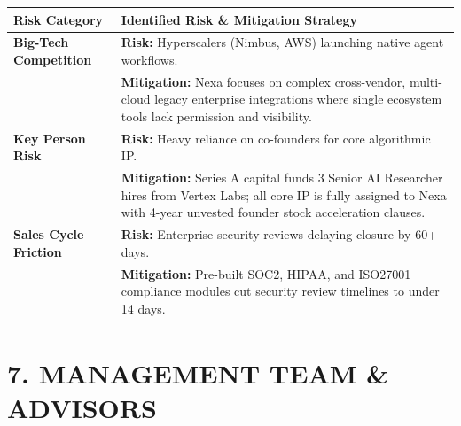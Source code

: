 \documentclass[10pt,a4paper]{article}
\begin{document}
\small
{}
\begin{tabularx}{\textwidth}{@{} L{2.6cm} Y @{}}
  \toprule
  \textbf{Risk Category} & \textbf{Identified Risk \& Mitigation Strategy} \\
  \midrule
  \textbf{Big-Tech Competition} & \textbf{Risk:} Hyperscalers (Nimbus, AWS) launching native agent workflows.\\[1pt]
  & \textbf{Mitigation:} Nexa focuses on complex cross-vendor, multi-cloud legacy enterprise integrations where single ecosystem tools lack permission and visibility. \\{}
  \textbf{Key Person Risk} & \textbf{Risk:} Heavy reliance on co-founders for core algorithmic IP.\\[1pt]
  & \textbf{Mitigation:} Series A capital funds 3 Senior AI Researcher hires from Vertex Labs; all core IP is fully assigned to Nexa with 4-year unvested founder stock acceleration clauses. \\{}
  \textbf{Sales Cycle Friction} & \textbf{Risk:} Enterprise security reviews delaying closure by 60+ days.\\[1pt]
  & \textbf{Mitigation:} Pre-built SOC2, HIPAA, and ISO27001 compliance modules cut security review timelines to under 14 days. \\
  \bottomrule
\end{tabularx}

\vspace{4pt}

\section*{7. MANAGEMENT TEAM \& ADVISORS}
\end{document}
